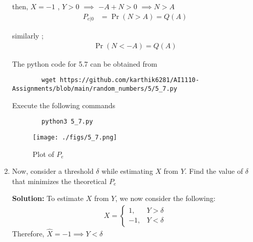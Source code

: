 \documentclass[journal,12pt,twocolumn]{IEEEtran}
\newcommand{\solution}{\noindent \textbf{Solution: }}
\providecommand{\pr}[1]{\ensuremath{\Pr\left(#1\right)}}
\numberwithin{equation}{section}
\renewcommand\thesection{\arabic{section}}
\begin{document}
\begin{enumerate}[label=\thesection.\arabic*,ref=\thesection.\theenumi]
	then, $X = -1$ , $Y > 0$ $\implies$ $-A + N > 0$ $\implies N > A$
	\begin{align}
	P_{e|0} &= \pr{N>A} = Q(A)
   \end{align}

similarly ;
\begin{align}
	\pr{N < -A} = Q(A)
\end{align}
	
	The python code for 5.7 can be obtained from
	\begin{lstlisting}
		wget https://github.com/karthik6281/AI1110-Assignments/blob/main/random_numbers/5/5_7.py
	\end{lstlisting}
	Execute the following commands
	\begin{lstlisting}
		python3 5_7.py
	\end{lstlisting}
	\begin{figure}
		\centering
		\texttt{[image: ./figs/5\_7.png]}
		\caption{Plot of $P_e$}
		\label{fig-5.7}
	\end{figure}
	
	\item Now, consider a threshold $\delta$  while estimating $X$ from $Y$. Find the value of $\delta$ that minimizes the theoretical $P_e$
	
	\solution 
	To estimate $X$ from $Y$, we now consider the following:
\begin{align}
    X = 
    \begin{cases}
        1, & Y > \delta \\
        -1, & Y < \delta
    \end{cases}
\end{align}
Therefore,
$\hat{X} = -1 \implies Y < \delta$
	

\end{enumerate}
\end{document}
